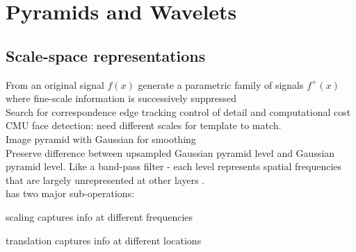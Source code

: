 \section{Pyramids and Wavelets}
\subsection*{Scale-space representations}
From an original signal $f(x)$ generate a parametric family of signals $f^+(x)$ where fine-scale information is successively suppressed  \\
 Search for correspondence  edge tracking  control of detail and computational cost \\
 CMU face detection: need different scales for template to match.\\
 Image pyramid with Gaussian for smoothing\\
 Preserve difference between upsampled Gaussian pyramid level and Gaussian pyramid level. Like a band-pass filter - each level represents spatial frequencies that are largely unrepresented at other layers .\\
 has two major sub-operations:
\begin{compactenum}
    \item scaling captures info at different frequencies
    \item translation captures info at different locations
\end{compactenum}